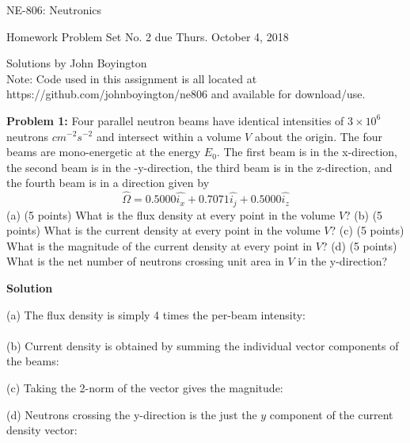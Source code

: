 \documentclass{amsart}
\theoremstyle{definition}
\begin{document}
\LARGE{NE-806: Neutronics}
 
\large
Homework Problem Set No. 2 due Thurs. October 4, 2018
 
Solutions by John Boyington \\
Note: Code used in this assignment is all located at https://github.com/johnboyington/ne806 and available for download/use.
\newline
\bigskip
 
\textbf{Problem 1:} Four parallel neutron beams have identical intensities of $3\times 10^6$ neutrons $cm^{-2} s^{-2}$ and intersect within a volume $V$ about the origin. The four beams are mono-energetic at the energy $E_0$. The first beam is in the x-direction, the second beam is in the -y-direction, the third beam is in the z-direction, and the fourth beam is in a direction given by
\begin{equation*}
    \hat{\Omega} = 0.5000 \hat{i_x} + 0.7071\hat{i_j} + 0.5000\hat{i_z}
\end{equation*}
(a) (5 points) What is the flux density at every point in the volume $V$?\newline
(b) (5 points) What is the current density at every point in the volume $V$?\newline
(c) (5 points) What is the magnitude of the current density at every point in $V$?\newline
(d) (5 points) What is the net number of neutrons crossing unit area in $V$ in the y-direction?\newline
 
\textbf{Solution}

(a) The flux density is simply 4 times the per-beam intensity: \\
 \\

(b) Current density is obtained by summing the individual vector components of the beams: \\

(c) Taking the 2-norm of the vector gives the magnitude: \\

(d) Neutrons crossing the y-direction is the just the $y$ component of the current density vector: \\
\end{document}
